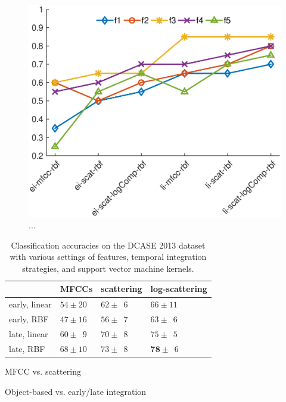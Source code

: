 \documentclass[journal]{IEEEtran}
\makeatletter
\newcommand*{\vs}{vs.\@\xspace}
\makeatother
\begin{document}
\begin{figure}
\begin{center}
\includegraphics[width=\columnwidth]{gfx/supervised_rbf_test3.eps}
\caption{...}
\end{center}
\end{figure}

\begin{table}
\begin{center}
\begin{tabular}{llll}
             & MFCCs         & scattering & log-scattering  \\
             \hline
early, linear  & $54\pm20$   & $62\pm\phantom{0}6$  & $66\pm11$     \\
early, RBF     & $47\pm16$  & $56\pm\phantom{0}7$  & $63\pm\phantom{0}6$   \\
late, linear  & $60\pm\phantom{0}9$ & $70\pm\phantom{0}8$  & $75\pm\phantom{0}5$   \\
late, RBF     & $68\pm10$ & $73\pm\phantom{0}8$  & $\mathbf{78}\pm\phantom{0}6$   \\
\end{tabular}
\caption{Classification accuracies on the DCASE 2013 dataset with various settings of features, temporal integration strategies, and support vector machine kernels.}
\end{center}
\end{table}

MFCC \vs scattering

Object-based \vs early/late integration
\end{document}
